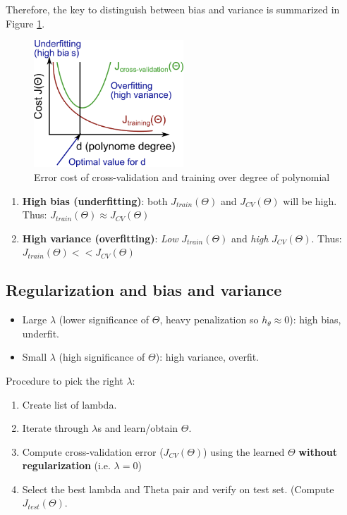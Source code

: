     Therefore, the key to distinguish between bias and variance is summarized in Figure \ref{fig:error-bias-variance}. 
    \begin{figure}[htbp]
        \centering
        \includegraphics[width=0.5\textwidth]{image/error-bias-variance.png}
        \caption{Error cost of cross-validation and training over degree of polynomial}
        \label{fig:error-bias-variance}
    \end{figure}

    \begin{enumerate}
        \item \textbf{High bias (underfitting)}: both $J_{train} (\Theta)$ and $J_{CV} (\Theta)$ will be high. Thus: $J_{train} (\Theta) \approx J_{CV} (\Theta)$
        \item  \textbf{High variance (overfitting)}: \emph{Low} $J_{train} (\Theta)$ and \emph{high} $J_{CV} (\Theta)$. Thus: $J_{train} (\Theta) <<  J_{CV} (\Theta)$

    \end{enumerate}

\subsection{Regularization and bias and variance}
    \begin{itemize}
        \item Large $\lambda$ (lower significance of $\Theta$, heavy penalization so $h_\theta \approx 0$): high bias, underfit. 
        \item Small $\lambda$ (high significance of $\Theta$): high variance, overfit. 
    \end{itemize}

    Procedure to pick the right $\lambda$:
    \begin{enumerate}
        \item Create list of lambda. 
        \item Iterate through $\lambda$s and learn/obtain $\Theta$. 
        \item Compute cross-validation error ($J_{CV} (\Theta) $) using the learned $\Theta$ \textbf{without regularization} (i.e. $\lambda = 0$)
        \item Select the best lambda and Theta pair and verify on test set. (Compute $J_{test} (\Theta)$.
    \end{enumerate}
